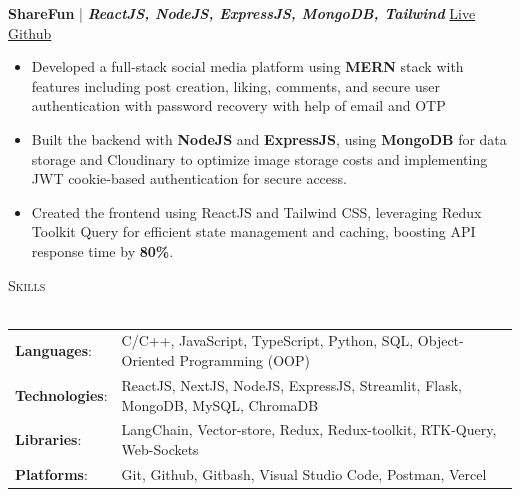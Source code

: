 \documentclass[a4paper]{article}
\newcommand{\lineunder} {
    \vspace*{-8pt} \\
    \hspace*{-18pt} \hrulefill \\
}
\newcommand{\header} [1] {
    {\hspace*{-18pt}\vspace*{6pt} \textsc{#1}}
    \vspace*{-6pt} \lineunder
}
\begin{document}
{\textbf{ShareFun}} {| \sl \textbf{ReactJS, NodeJS, ExpressJS, MongoDB, Tailwind}} \hfill \href{https://sharefun-client.vercel.app}{\color{blue}Live} \hspace{3pt} \href{https://github.com/Aryan123-rgb/FullStackSocialMedia}{\color{blue}Github}  \\

\begin{itemize}
    \vspace{-0.5mm}
    \item Developed a full-stack social media platform using \textbf{MERN} stack with features including post creation, liking, comments, and secure user authentication with password recovery with help of email and OTP
    \vspace{-1mm}
    \item Built the backend with \textbf{NodeJS} and \textbf{ExpressJS}, using \textbf{MongoDB} for data storage and Cloudinary to optimize image storage costs and implementing JWT cookie-based authentication for secure access.
    \vspace{-1mm}
    \item Created the frontend using ReactJS and Tailwind CSS, leveraging Redux Toolkit Query for efficient state management and caching, boosting API response time by \textbf{80\%}.
    
\end{itemize}

\header{Skills}
\vspace{1mm}
\begin{tabular}{@{} l l @{}}
    \textbf{Languages}:            & C/C++, JavaScript, TypeScript, Python, SQL, Object-Oriented Programming (OOP)  \\[1mm]
    \textbf{Technologies}:         &ReactJS, NextJS, NodeJS, ExpressJS, Streamlit, Flask, MongoDB, MySQL, ChromaDB \\[1mm]
    \textbf{Libraries}:            & LangChain, Vector-store, Redux, Redux-toolkit, RTK-Query, Web-Sockets\\[1mm]
    \textbf{Platforms}:            & Git, Github, Gitbash, Visual Studio Code, Postman, Vercel \\
\end{tabular}

\vspace{2mm}
\vspace{1mm}
\end{document}
